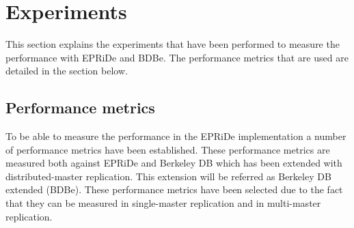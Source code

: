 \section{Experiments} %
\label{sec:experiments}

This section explains the experiments that have been performed to measure the performance with EPRiDe and BDBe. The performance metrics that are used are detailed in the section below.

\subsection{Performance metrics} %
\label{sub:experiments_performance_metrics}

To be able to measure the performance in the EPRiDe implementation a number of performance metrics have been established. These performance metrics are measured both against EPRiDe and Berkeley DB which has been extended with distributed-master replication. This extension will be referred as Berkeley DB extended (BDBe). These performance metrics have been selected due to the fact that they can be measured in single-master replication and in multi-master replication.

